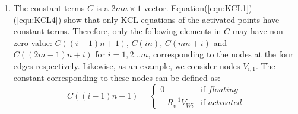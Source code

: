 \begin{enumerate}
  \item The constant terms $C$ is a $2mn{\times}1$ vector. Equation(\ref{equ:KCL1})-(\ref{equ:KCL4}) show that only KCL equations of the activated points have constant terms. Therefore, only the following elements in $C$ may have non-zero value: $C((i-1)n+1)$, $C(in)$, $C(mn+i)$ and $C((2m-1)n+i)$ for $i=1,2...m$, corresponding to the nodes at the four edges respectively. Likewise, as an example, we consider nodes $V_{i,1}$. The constant corresponding to these nodes can be defined as:
    \begin{equation}
    C((i-1)n+1) = \left\{
    \begin{array}{ll}
    0   & \text{if } floating\\
    -R_v^{-1}V_{Wi}& \text{if } activated
    \end{array} \right.
    \end{equation}
\end{enumerate}
